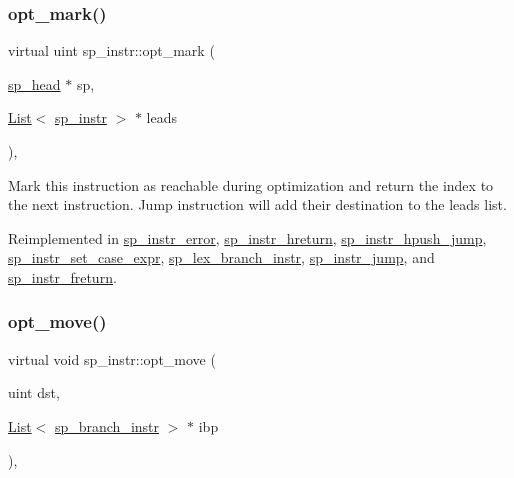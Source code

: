 \mbox{\label{classsp__instr_a10b7b33a30316fca4cff5adfe98e282c}} 
\subsubsection{\texorpdfstring{opt\+\_\+mark()}{opt\_mark()}}
{\footnotesize\ttfamily virtual uint sp\+\_\+instr\+::opt\+\_\+mark (\begin{DoxyParamCaption}\item[{\mbox{\hyperlink{classsp__head}{sp\+\_\+head}} $\ast$}]{sp,  }\item[{\mbox{\hyperlink{classList}{List}}$<$ \mbox{\hyperlink{classsp__instr}{sp\+\_\+instr}} $>$ $\ast$}]{leads }\end{DoxyParamCaption})\hspace{0.3cm}{\ttfamily [inline]}, {\ttfamily [virtual]}}

Mark this instruction as reachable during optimization and return the index to the next instruction. Jump instruction will add their destination to the leads list. 

Reimplemented in \mbox{\hyperlink{classsp__instr__error_ac36f346ce3637910ebab73e2e9fa9cf4}{sp\+\_\+instr\+\_\+error}}, \mbox{\hyperlink{classsp__instr__hreturn_a2154f9d995bbd7aa47b0fe714ef3c33f}{sp\+\_\+instr\+\_\+hreturn}}, \mbox{\hyperlink{classsp__instr__hpush__jump_affb8b5892ac7dd82bcbb99183f6bc6e3}{sp\+\_\+instr\+\_\+hpush\+\_\+jump}}, \mbox{\hyperlink{classsp__instr__set__case__expr_a40890fccd0dca44d11d61dcb0a88b043}{sp\+\_\+instr\+\_\+set\+\_\+case\+\_\+expr}}, \mbox{\hyperlink{classsp__lex__branch__instr_a07500581e51283aad3b04602a7b87c74}{sp\+\_\+lex\+\_\+branch\+\_\+instr}}, \mbox{\hyperlink{classsp__instr__jump_a4daedb439c97a78adf9957fc35121dbe}{sp\+\_\+instr\+\_\+jump}}, and \mbox{\hyperlink{classsp__instr__freturn_a9556622fcb532514742de4c9fdf4d506}{sp\+\_\+instr\+\_\+freturn}}.

\mbox{\label{classsp__instr_a7b73990576fc8cd3f4a8bd16003ab44b}} 
\subsubsection{\texorpdfstring{opt\+\_\+move()}{opt\_move()}}
{\footnotesize\ttfamily virtual void sp\+\_\+instr\+::opt\+\_\+move (\begin{DoxyParamCaption}\item[{uint}]{dst,  }\item[{\mbox{\hyperlink{classList}{List}}$<$ \mbox{\hyperlink{classsp__branch__instr}{sp\+\_\+branch\+\_\+instr}} $>$ $\ast$}]{ibp }\end{DoxyParamCaption})\hspace{0.3cm}{\ttfamily [inline]}, {\ttfamily [virtual]}}

